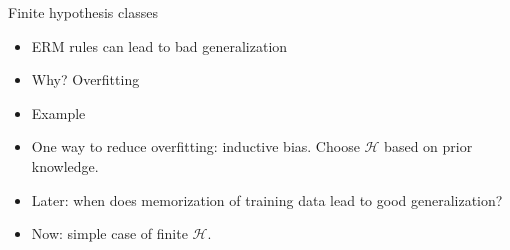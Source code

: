 \documentclass[final]{beamer}
\begin{document}
\begin{frame}{Finite hypothesis classes}
	\begin{itemize}
		\item ERM rules can lead to bad generalization
		\pause
		\item Why? Overfitting
		\pause
		\item Example
		\pause
		\item One way to reduce overfitting: inductive bias. Choose $\mathcal{H}$ based on prior knowledge.
		\pause 
		\item Later: when does memorization of training data lead to good generalization?
		\pause
	\item Now: simple case of finite $\mathcal{H}$. 
	
	\end{itemize}
\end{frame}
\end{document}
